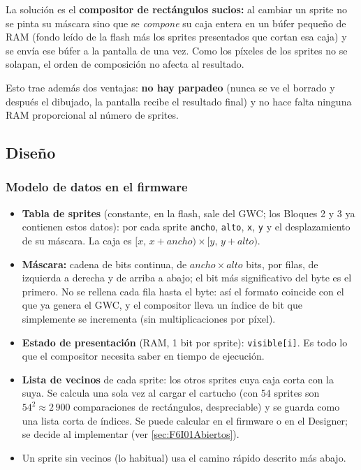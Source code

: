 La solución es el \textbf{compositor de rectángulos sucios:} al cambiar un sprite no se pinta su máscara sino que se \emph{compone} su caja entera en un búfer pequeño de RAM (fondo leído de la flash más los sprites presentados que cortan esa caja) y se envía ese búfer a la pantalla de una vez. Como los píxeles de los sprites no se solapan, el orden de composición no afecta al resultado.

Esto trae además dos ventajas: \textbf{no hay parpadeo} (nunca se ve el borrado y después el dibujado, la pantalla recibe el resultado final) y no hace falta ninguna RAM proporcional al número de sprites.

\subsection{Diseño}
\label{sec:F6I01Diseno}

\subsubsection{Modelo de datos en el firmware}

\begin{itemize}
	\item \textbf{Tabla de sprites} (constante, en la flash, sale del GWC; los Bloques 2 y 3 ya contienen estos datos): por cada sprite \texttt{ancho}, \texttt{alto}, \texttt{x}, \texttt{y} y el desplazamiento de su máscara. La caja es $[x,\,x+ancho)\times[y,\,y+alto)$.
	\item \textbf{Máscara:} cadena de bits continua, de $ancho\times alto$ bits, por filas, de izquierda a derecha y de arriba a abajo; el bit más significativo del byte es el primero. No se rellena cada fila hasta el byte: así el formato coincide con el que ya genera el GWC, y el compositor lleva un índice de bit que simplemente se incrementa (sin multiplicaciones por píxel).
	\item \textbf{Estado de presentación} (RAM, 1 bit por sprite): \texttt{visible[i]}. Es todo lo que el compositor necesita saber en tiempo de ejecución.
	\item \textbf{Lista de vecinos} de cada sprite: los otros sprites cuya caja corta con la suya. Se calcula una sola vez al cargar el cartucho (con 54 sprites son $54^2\approx 2\,900$ comparaciones de rectángulos, despreciable) y se guarda como una lista corta de índices. Se puede calcular en el firmware o en el Designer; se decide al implementar (ver \ref{sec:F6I01Abiertos}).
	\item Un sprite sin vecinos (lo habitual) usa el camino rápido descrito más abajo.
\end{itemize}

